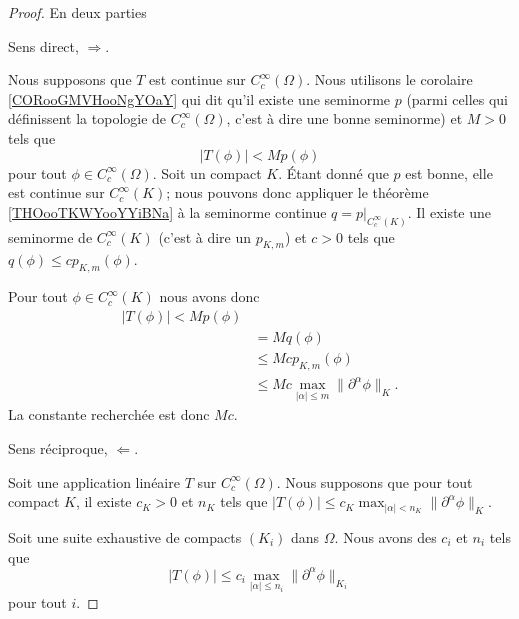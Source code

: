 \begin{proof}
	En deux parties
	\begin{proofpart}
		Sens direct, \( \Rightarrow\).
	\end{proofpart}
	Nous supposons que \( T\) est continue sur \( C^{\infty}_c(\Omega)\). Nous utilisons le corolaire \ref{CORooGMVHooNgYOaY} qui dit qu'il existe une seminorme \( p\) (parmi celles qui définissent la topologie de \( C^{\infty}_c(\Omega)\), c'est à dire une bonne seminorme) et \( M>0\) tels que
	\begin{equation}
		| T(\phi) |< Mp(\phi)
	\end{equation}
	pour tout \( \phi\in C^{\infty}_c(\Omega)\). Soit un compact \( K\). Étant donné que \( p\) est bonne, elle est continue sur \( C^{\infty}_c(K)\); nous pouvons donc appliquer le théorème \ref{THOooTKWYooYYiBNa} à la seminorme continue \( q=p|_{C^{\infty}_c(K)}\). Il existe une seminorme de \( C^{\infty}_c(K)\) (c'est à dire un \( p_{K,m}\)) et \( c>0\) tels que \( q(\phi)\leq c p_{K,m}(\phi)\).

	Pour tout \( \phi\in C^{\infty}_c(K)\) nous avons donc
	\begin{subequations}
		\begin{align}
			| T(\phi) |< Mp(\phi)                                           \\
			 & =Mq(\phi)                                                    \\
			 & \leq Mc p_{K,m}(\phi)                                        \\
			 & \leq Mc\max_{| \alpha |\leq m}\| \partial^{\alpha}\phi \|_K.
		\end{align}
	\end{subequations}
	La constante recherchée est donc \( Mc\).

	\begin{proofpart}
		Sens réciproque, \( \Leftarrow\).
	\end{proofpart}

	Soit une application linéaire \( T\) sur \( C^{\infty}_c(\Omega)\). Nous supposons que pour tout compact \( K\), il existe \( c_K>0\) et \( n_K\) tels que \( | T(\phi) |\leq c_K  \max_{| \alpha |<n_K}\| \partial^{\alpha}\phi \|_K   \).

	Soit une suite exhaustive de compacts \( (K_i)\) dans \( \Omega\). Nous avons des \( c_i\) et \( n_i\) tels que
	\begin{equation}		\label{EQooKRRTooKWTAap}
		| T(\phi) |\leq c_i\max_{| \alpha |\leq n_i}\| \partial^{\alpha}\phi \|_{K_i}
	\end{equation}
	pour tout \( i\).


\end{proof}
